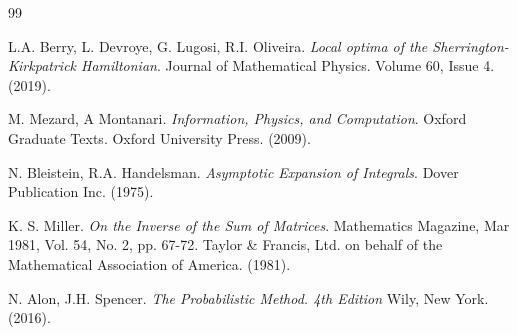 \documentclass[10pt]{article}
\newenvironment{Proof of lemma}{\noindent{\bf Proof of Lemma}}{\hfill$\Box$\newline}
\newenvironment{Proof of claim}{\noindent{\bf Proof of claim}}{\hfill$\Box$\newline}
\newenvironment{Proof of theorem}{\noindent{\bf Proof of Theorem}}{\hfill\scriptsize{$\Box$}\newline}
\newenvironment{Proof of theorems}{\noindent{\bf Proof of Theorems}}{\hfill$\Box$\newline}
\newenvironment{Proof of proposition}{\noindent{\bf Proof of Proposition}}{\hfill$\Box$\newline}
\newenvironment{Proof of propositions}{\noindent{\bf Proof of Propositions}}{\hfill$\Box$\newline}
\newenvironment{Proof of exercise}{\noindent{\it Proof of Exercise:}}{\hfill$\Box$}
\numberwithin{equation}{section}
\begin{document}
\begin{thebibliography}{99}

L.A. Berry, L. Devroye, G. Lugosi, R.I. Oliveira. \textit{Local optima of the Sherrington-Kirkpatrick Hamiltonian}. Journal of Mathematical Physics. Volume 60, Issue 4. (2019).

 M. Mezard, A Montanari. \textit{Information, Physics, and Computation}. Oxford Graduate Texts. Oxford University Press. (2009).

 N. Bleistein, R.A. Handelsman. \textit{Asymptotic Expansion of Integrals}. Dover Publication Inc. (1975).

 K. S. Miller. \textit{On the Inverse of the Sum of Matrices}. Mathematics Magazine, Mar 1981, Vol. 54, No. 2, pp. 67-72. Taylor \& Francis, Ltd. on behalf of the Mathematical Association of America. (1981).

N. Alon, J.H. Spencer. \textit{The Probabilistic Method. 4th Edition} Wily, New York. (2016).
\end{thebibliography}
\end{document}
